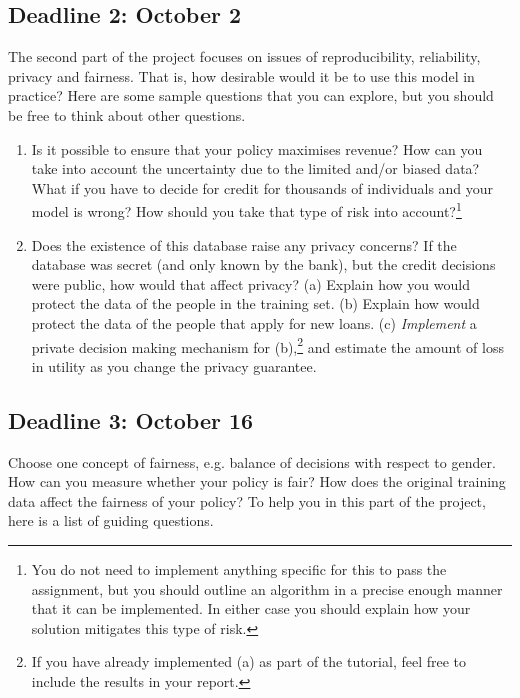 \subsection{Deadline 2: October 2}
The second part of the project focuses on issues of reproducibility, reliability, privacy and fairness. That is, how desirable would it be to use this model in practice? Here are some sample questions that you can explore, but you should be free to think about other questions.
\begin{enumerate}
\item Is it possible to ensure that your policy maximises revenue? How can you take into account the uncertainty due to the limited and/or biased data? What if you have to decide for credit for thousands of individuals and your model is wrong? How should you take that type of risk into account?\footnote{You do not need to implement anything specific for this to pass the assignment, but you should outline an algorithm in a precise enough manner that it can be implemented. In either case you should explain how your solution mitigates this type of risk.}
\item Does the existence of this database raise any privacy concerns? If the database was secret (and only known by the bank), but the credit decisions were public, how would that affect privacy? (a) Explain how you would protect the data of the people in the training set. (b) Explain how would protect the data of the people that apply for new loans. (c) \emph{Implement} a private decision making mechanism for (b),\footnote{If you have already implemented (a) as part of the tutorial, feel free to include the results in your report.} and estimate the amount of loss in utility as you change the privacy guarantee.
\end{enumerate}

\subsection{Deadline 3: October 16}

 Choose one concept of fairness, e.g. balance of decisions with respect to gender. How can you measure whether your policy is fair? How does the original training data affect the fairness of your policy? To help you in this part of the project, here is a list of guiding questions.

